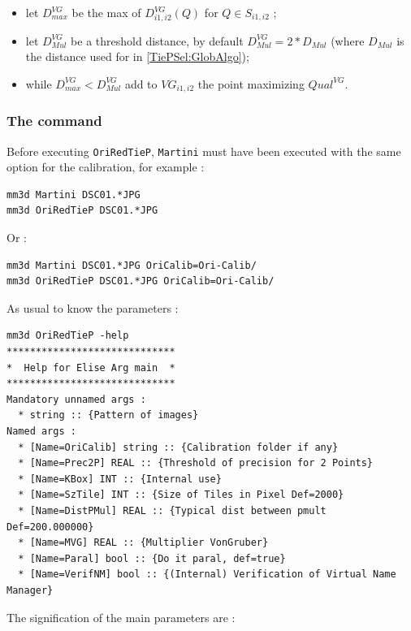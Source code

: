 \begin{itemize}
    \item let $D^{VG}_{max}$ be the max of $D^{VG}_{i1,i2}(Q)$ for $Q\in S_{i1,i2}$ ;
    \item let $D^{VG}_{Mul}$ be a threshold distance, by default $D^{VG}_{Mul} = 2 * D_{Mul}$
          (where $ D_{Mul}$ is the distance used for in \ref{TiePSel:GlobAlgo});

    \item while  $D^{VG}_{max} < D^{VG}_{Mul}$  add to  $VG_{i1,i2}$ the point maximizing $ Qual^{VG}$.
\end{itemize}


\subsubsection{The command}

Before executing {\tt OriRedTieP}, {\tt Martini} must have been executed with the same option for the
calibration, for example :


\begin{verbatim}
mm3d Martini DSC01.*JPG
mm3d OriRedTieP DSC01.*JPG
\end{verbatim}

Or :

\begin{verbatim}
mm3d Martini DSC01.*JPG OriCalib=Ori-Calib/
mm3d OriRedTieP DSC01.*JPG OriCalib=Ori-Calib/
\end{verbatim}

As usual to know the parameters :


\begin{verbatim}
mm3d OriRedTieP -help
*****************************
*  Help for Elise Arg main  *
*****************************
Mandatory unnamed args : 
  * string :: {Pattern of images}
Named args : 
  * [Name=OriCalib] string :: {Calibration folder if any}
  * [Name=Prec2P] REAL :: {Threshold of precision for 2 Points}
  * [Name=KBox] INT :: {Internal use}
  * [Name=SzTile] INT :: {Size of Tiles in Pixel Def=2000}
  * [Name=DistPMul] REAL :: {Typical dist between pmult Def=200.000000}
  * [Name=MVG] REAL :: {Multiplier VonGruber}
  * [Name=Paral] bool :: {Do it paral, def=true}
  * [Name=VerifNM] bool :: {(Internal) Verification of Virtual Name Manager}
\end{verbatim}

The signification of the main parameters are :

